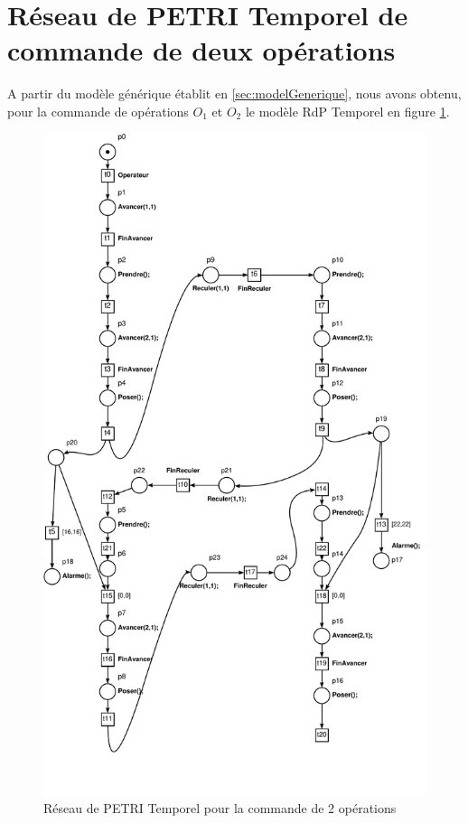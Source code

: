\section{Réseau de PETRI Temporel de commande de deux opérations}
A partir du modèle générique établit en \ref{sec:modelGenerique}, nous avons obtenu, pour la commande de opérations $O_1$ et $O_2$ le modèle RdP Temporel en figure \ref{fig:command2Opes}.
\begin{figure}
\centering
\includegraphics[height = \textheight]{./II/images/reseau_CommandeIII-2.pdf}
\caption{Réseau de PETRI Temporel pour la commande de 2 opérations}\label{fig:command2Opes}
\end{figure}


